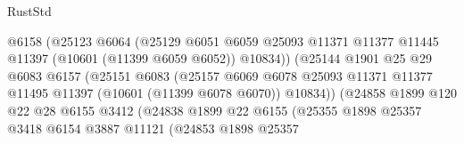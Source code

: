 \begin{lexlean}{RustStd}
\begin{coremodule}
                                      @6158
                                      (@25123
                                        @6064
                                        (@25129
                                          @6051
                                          @6059
                                          @25093
                                          @11371
                                          @11377
                                          @11445
                                          @11397
                                          (@10601 (@11399 @6059 @6052))
                                          @10834))
                                      (@25144
                                        @1901
                                        @25
                                        @29
                                        @6083
                                        @6157
                                        (@25151
                                          @6083
                                          (@25157
                                            @6069
                                            @6078
                                            @25093
                                            @11371
                                            @11377
                                            @11495
                                            @11397
                                            (@10601 (@11399 @6078 @6070))
                                            @10834))
                                        (@24858
                                          @1899
                                          @120
                                          @22
                                          @28
                                          @6155
                                          @3412
                                          (@24838
                                            @1899
                                            @22
                                            @6155
                                            (@25355
                                              @1898
                                              @25357
                                              @3418
                                              @6154
                                              @3887
                                              @11121
                                              (@24853
                                                @1898
                                                @25357

\end{coremodule}
\end{lexlean}
